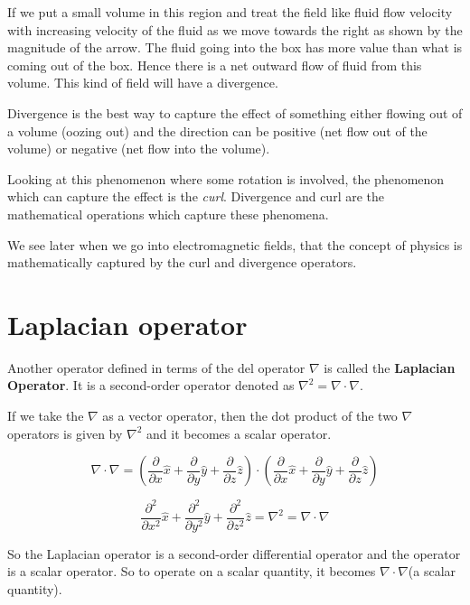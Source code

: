 If we put a small volume in this region and treat the field like fluid flow velocity with increasing velocity of the fluid as we move towards the right as shown by the magnitude of the arrow. The fluid going into the box has more value than what is coming out of the box. Hence there is a net outward flow of fluid from this volume. This kind of field will have a divergence.

Divergence is the best way to capture the effect of something either flowing out of a volume (oozing out) and the direction can be positive (net flow out of the volume) or negative (net flow into the volume).

Looking at this phenomenon where some rotation is involved, the phenomenon which can capture the effect is the \textit{curl}. Divergence and curl are the mathematical operations which capture these phenomena.

We see later when we go into electromagnetic fields, that the concept of physics is mathematically captured by the curl and divergence operators.

\section{Laplacian operator}
Another operator defined in terms of the del operator $\nabla$ is called the \textbf{Laplacian Operator}. It is a second-order operator denoted as $\nabla^2 = \nabla \cdot \nabla$.

If we take the $\nabla$ as a vector operator, then the dot product of the two $\nabla$ operators is given by $\nabla^2$ and it becomes a scalar operator.

\begin{dmath}
\nabla \cdot \nabla =  \left(\frac{\partial  }{\partial x}\hat x + \frac{\partial  }{\partial y}\hat y + \frac{\partial  }{\partial z}\hat z \right) \cdot \left( \frac{\partial  }{\partial x}\hat x + \frac{\partial  }{\partial y}\hat y + \frac{\partial  }{\partial z}\hat z\right)
\end{dmath}

\begin{dmath}
\frac{\partial^{2}  }{\partial x^{2}}\hat x + \frac{\partial^{2}  }{\partial y^{2}}\hat y + \frac{\partial^{2}  }{\partial z^{2}}\hat z = \nabla^{2} = \nabla \cdot \nabla
\end{dmath}

So the Laplacian operator is a second-order differential operator and the operator is a scalar operator. So to operate on a scalar quantity, it becomes $\nabla\cdot\nabla$(a scalar quantity).

